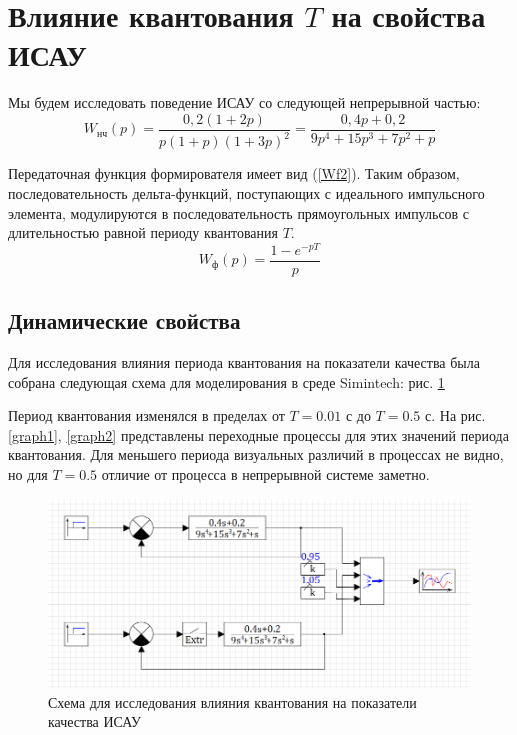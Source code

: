 	\section{Влияние квантования $T$ на свойства ИСАУ}
	
	Мы будем исследовать поведение ИСАУ со следующей непрерывной частью:
	\begin{equation}
		W_\text{нч}(p) = \frac{ 0,2 (1+2p)}{ p (1+p) (1+3p)^2 } = \frac{ 0,4p + 0,2 } { 9p^4 + 15p^3 + 7p^2 + p }
		\label{Wnch}
	\end{equation}
	
	Передаточная функция формирователя имеет вид (\ref{Wf2}). Таким образом, последовательность дельта-функций, поступающих с идеального импульсного элемента, модулируются в последовательность прямоугольных импульсов с длительностью равной периоду квантования $T$.
	\begin{equation}
		W_\text{ф}(p) = \frac{1-e^{-pT}}{p}
		\label{Wf2}
	\end{equation}
	
	\subsection{Динамические свойства}
	
	Для исследования влияния периода квантования на показатели качества была собрана следующая схема для моделирования в среде Simintech: рис. \ref{scheme1}
	
	Период квантования изменялся в пределах от $T=0.01$ с до $T=0.5$ с. На рис. \ref{graph1}, \ref{graph2} представлены переходные процессы для этих значений периода квантования. Для меньшего периода визуальных различий в процессах не видно, но для $T=0.5$ отличие от процесса в непрерывной системе заметно.
	
	\begin{figure}
		\centering\includegraphics[width=.7\textwidth]{png/scheme1.png}
		\caption{Схема для исследования влияния квантования на показатели качества ИСАУ}
		\label{scheme1}
	\end{figure}
	
